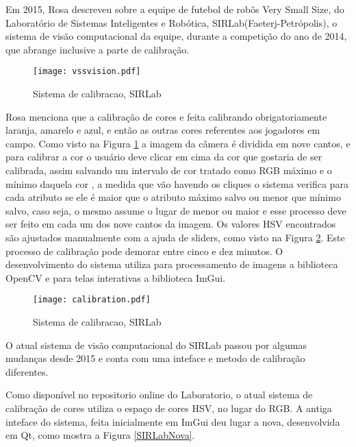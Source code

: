 Em 2015, Rosa\cite{Rosa:2015} descreveu sobre a equipe de futebol de rob\^os Very Small Size, do Laboratório de Sistemas Inteligentes e Robótica, SIRLab(Faeterj-Petrópolis), o sistema de visão computacional da equipe, durante a competição do ano de 2014, que abrange inclusive a parte de calibração. 

\begin{figure}[H]
	\centering
	\texttt{[image: vssvision.pdf]} 	
	\caption{Sistema de calibracao, SIRLab \cite{Rosa:2015}}
	\label{SIRLabCalibracao}
\end{figure}
Rosa menciona que a calibração de cores e feita calibrando obrigatoriamente laranja, amarelo e azul, e então as outras cores referentes aos jogadores em campo. Como visto na Figura \ref{SIRLabCalibracao} a imagem da c\^amera é dividida em nove cantos, e para calibrar a cor o usuário deve clicar em cima da cor que gostaria de ser calibrada, assim salvando um intervalo de cor tratado como RGB máximo e o mínimo daquela cor , a medida
que vão havendo os cliques o sistema verifica para cada atributo se ele é maior que o atributo
máximo salvo ou menor que mínimo salvo, caso seja, o mesmo assume o lugar de menor ou
maior\cite{Rosa:2015} e esse processo deve ser feito em cada um dos nove cantos da imagem. Os valores HSV encontrados s\~ao ajustados manualmente com a ajuda de sliders, como visto na Figura \ref{SIRLabCalibracaoHSV}. Este processo de calibração pode demorar entre cinco e dez minutos.
O desenvolvimento do sistema utiliza para processamento de imagens a biblioteca OpenCV e para telas interativas a biblioteca  ImGui.

\begin{figure}[!h]
	\centering
	\texttt{[image: calibration.pdf]} 	
	\caption{Sistema de calibracao, SIRLab \cite{VSSVision}}
	\label{SIRLabCalibracaoHSV}
\end{figure}

O atual sistema de visão computacional do SIRLab passou por algumas mudanças desde 2015 e conta com uma inteface e metodo de calibração diferentes\cite{VSSVision}. 

Como disponível no repositorio online do Laboratorio, o atual sistema de calibração de cores utiliza o espaço de cores HSV, no lugar do RGB\cite{Rosa:2015}. A antiga inteface do sistema, feita inicialmente em ImGui deu lugar a nova, desenvolvida em Qt, como mostra a Figura \ref{SIRLabNova}.

